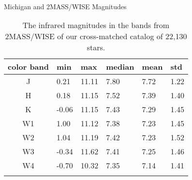 \begin{table}[t]
    \footnotesize
    \centering
    \caption{Michigan and 2MASS/WISE Magnitudes}
    \begin{tabular}{clllll}
    \toprule
    color band & min & max & median & mean & std \\ \midrule
    J & 0.21 & 11.11 & 7.80 & 7.72 & 1.22 \\
    H & 0.18 & 11.15 & 7.52 & 7.39 & 1.40 \\
    K & -0.06 & 11.15 & 7.43 & 7.29 & 1.45 \\
    W1 & 1.00 & 11.12 & 7.38 & 7.23 & 1.45 \\
    W2 & 1.04 & 11.19 & 7.42 & 7.23 & 1.52 \\
    W3 & -0.34 & 11.62 & 7.41 & 7.25 & 1.46 \\
    W4 & -0.70 & 10.32 & 7.35 & 7.14 & 1.41 \\
    \bottomrule
    \addlinespace[10pt]
    \end{tabular}
    \caption*{The infrared magnitudes in the bands from 2MASS/WISE of our cross-matched catalog of 22,130 stars.}
    \label{table:michigan_mags}
\end{table}